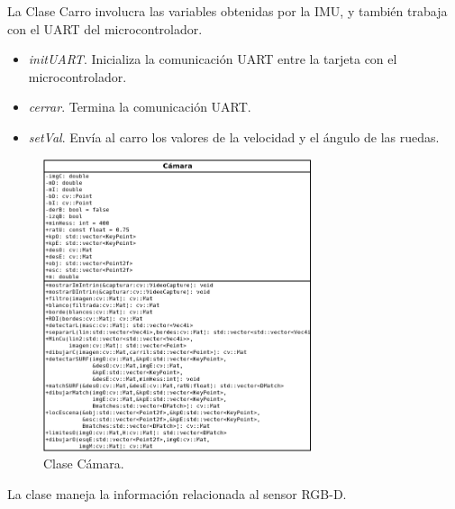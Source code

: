 \par La Clase Carro involucra las variables obtenidas por la IMU, y también trabaja con el UART del microcontrolador.
\begin{itemize}
	\item {\it initUART}. Inicializa la comunicación UART entre la tarjeta con el microcontrolador.
	\item {\it cerrar}. Termina la comunicación UART.
	\item {\it setVal}. Envía al carro los valores de la velocidad y el ángulo de las ruedas.
\end{itemize}
\begin{figure}[htbp!]
	\centering
	\includegraphics[width=0.7\textwidth]{./Figuras/camClass}
	\caption{Clase Cámara.}
	\label{fig:camC}
\end{figure}
\par La clase maneja la información relacionada al sensor RGB-D.
